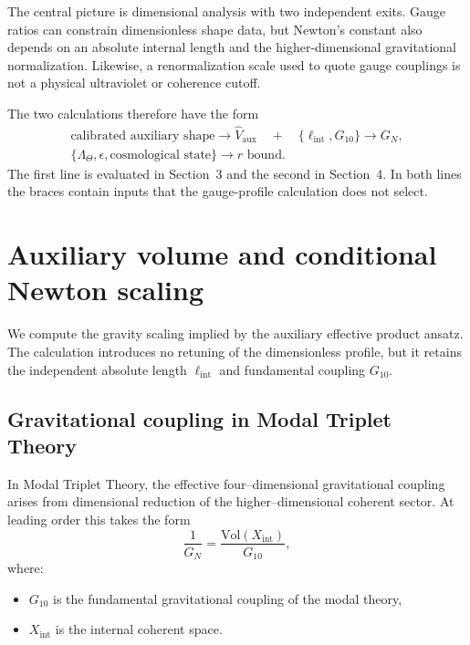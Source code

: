 \documentclass[11pt]{article}
\begin{document}
The central picture is dimensional analysis with two independent exits. Gauge
ratios can constrain dimensionless shape data, but Newton's constant also
depends on an absolute internal length and the higher-dimensional
gravitational normalization. Likewise, a renormalization scale used to quote
gauge couplings is not a physical ultraviolet or coherence cutoff.

The two calculations therefore have the form
\[
\begin{gathered}
\text{calibrated auxiliary shape}
\longrightarrow
\widehat V_{\mathrm{aux}}
\quad+\quad
\{\ell_{\mathrm{int}},G_{10}\}
\longrightarrow G_N,\\
\{\Lambda_\Theta,\epsilon,\text{cosmological state}\}
\longrightarrow r\text{ bound}.
\end{gathered}
\]
The first line is evaluated in Section~3 and the second in Section~4. In both
lines the braces contain inputs that the gauge-profile calculation does not
select.


\section{Auxiliary volume and conditional Newton scaling}

We compute the gravity scaling implied by the auxiliary effective product
ansatz. The calculation introduces no retuning of the dimensionless profile,
but it retains the independent absolute length $\ell_{\mathrm{int}}$ and
fundamental coupling $G_{10}$.

\subsection{Gravitational coupling in Modal Triplet Theory}

In Modal Triplet Theory, the effective four--dimensional gravitational coupling
arises from dimensional reduction of the higher--dimensional coherent sector.
At leading order this takes the form
\begin{equation}
\frac{1}{G_N}
=
\frac{\mathrm{Vol}(X_{\mathrm{int}})}{G_{10}},
\label{eq:GN_reduction}
\end{equation}
where:
\begin{itemize}
\item $G_{10}$ is the fundamental gravitational coupling of the modal theory,
\item $X_{\mathrm{int}}$ is the internal coherent space.
\end{itemize}
\end{document}
